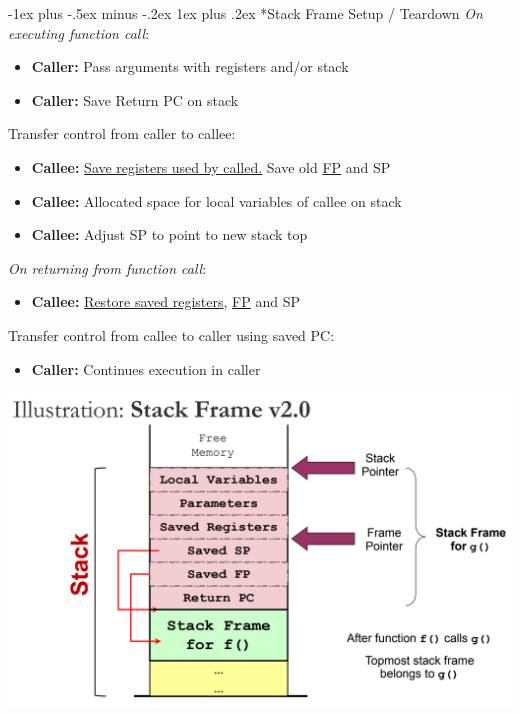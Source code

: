 \documentclass[10pt,landscape]{article}
\makeatletter
\renewcommand{\subsubsection}{\@startsection{subsubsection}{3}{0mm}%
                                {-1ex plus -.5ex minus -.2ex}%
                                {1ex plus .2ex}%
                                {\normalfont\small\bfseries}}
\makeatother
\begin{document}
\begin{multicols*}{3}
\subsubsection*{Stack Frame Setup / Teardown}
\textit{On executing function call}:
\begin{itemize}[topsep=0pt,noitemsep,wide=0pt, leftmargin=\dimexpr{} + 2\relax]
    \item \colorbox{orange!80}{%
        \textbf{Caller:} Pass arguments with registers and/or stack
    }
    \item \colorbox{orange!80}{%
        \textbf{Caller:} Save Return PC on stack
    }
\end{itemize}
Transfer control from caller to callee:
\begin{itemize}[topsep=0pt,noitemsep,wide=0pt, leftmargin=\dimexpr{} + 2\relax]
    \item \colorbox{teal!80}{%
        \textbf{Callee:} \underline{Save registers used by called.} Save old \underline{FP} and SP
    }
    \item \colorbox{teal!80}{%
        \textbf{Callee:} Allocated space for local variables of callee on stack
    }
    \item \colorbox{teal!80}{%
        \textbf{Callee:} Adjust SP to point to new stack top
    }
\end{itemize}
\textit{On returning from function call}:
\begin{itemize}[topsep=0pt,noitemsep,wide=0pt, leftmargin=\dimexpr{} + 2\relax]
    \item \colorbox{teal!80}{%
        \textbf{Callee:} \underline{Restore saved registers}, \underline{FP} and SP
    }
\end{itemize}
Transfer control from callee to caller using saved PC:
\begin{itemize}[topsep=0pt,noitemsep,wide=0pt, leftmargin=\dimexpr{} + 2\relax]
    \item \colorbox{orange!80}{%
        \textbf{Caller:} Continues execution in caller
    }
\end{itemize}
\includegraphics[scale=0.29]{images/stackframe.png}

\end{multicols*}
\end{document}
